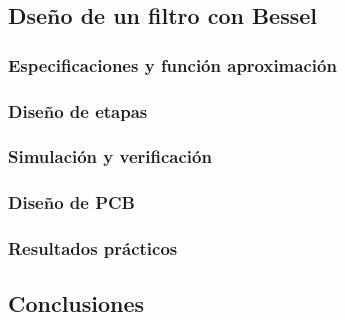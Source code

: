 \subsection{Dse\~no de un filtro con Bessel}

\subsubsection{Especificaciones y funci\'on aproximaci\'on}

\subsubsection{Dise\~no de etapas}

\subsubsection{Simulaci\'on y verificaci\'on}

\subsubsection{Dise\~no de PCB}

\subsubsection{Resultados pr\'acticos}

\subsection{Conclusiones}